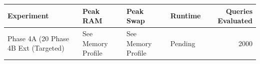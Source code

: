 \begin{tabular}{llllr}
\toprule
Experiment & Peak RAM & Peak Swap & Runtime & Queries Evaluated \\
\midrule
Phase 4A (20%
Phase 4B Ext (Targeted) & See Memory Profile & See Memory Profile & Pending & 2000 \\
\bottomrule
\end{tabular}
